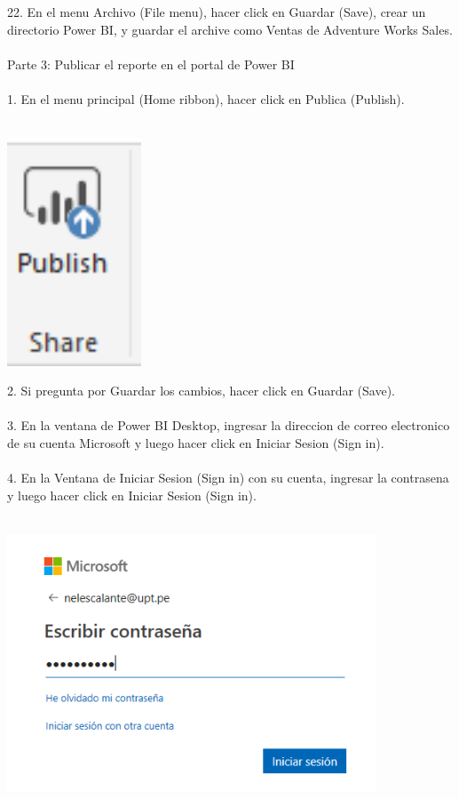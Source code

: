 \documentclass[12pt,letterpaper]{article}
\begin{document}
22. En el menu Archivo (File menu), hacer click en Guardar (Save), crear un directorio Power BI, y guardar el
archive como Ventas de Adventure Works Sales.\\\\
Parte 3: Publicar el reporte en el portal de Power BI\\\\
1. En el menu principal (Home ribbon), hacer click en Publica (Publish).\\\\
\begin{center}
\includegraphics[width=4cm]{IMG/a.png} 
\end{center}
2. Si pregunta por Guardar los cambios, hacer click en Guardar (Save).\\\\
3. En la ventana de Power BI Desktop, ingresar la direccion de correo electronico de su cuenta Microsoft y
luego hacer click en Iniciar Sesion (Sign in).\\\\
4. En la Ventana de Iniciar Sesion (Sign in) con su cuenta, ingresar la contrasena y luego hacer click en Iniciar
Sesion (Sign in).\\\\
\begin{center}
\includegraphics[width=11cm]{IMG/b.png} 
\end{center}
\end{document}
